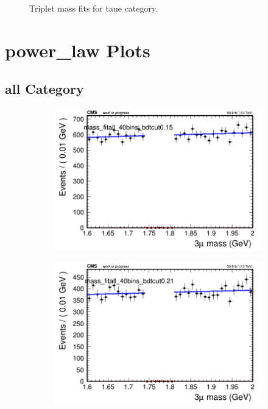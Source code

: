 \begin{figure}[H]
\begin{subfigure}{0.2\textwidth}
        \caption{}
    \end{subfigure}
    \caption{Triplet mass fits for taue category.}
    \label{fig:unfixedexptaue}
\end{figure}

\section{power\_law Plots}

\subsection{all Category}
\label{sec:powerlawall}

\begin{figure}[H]
    \centering
    \begin{subfigure}{0.2\textwidth}
        \includegraphics[width=\textwidth]{power_law/plots/all/massfit_all_40bins_bdtcut0.15.png}
        \caption{}
    \end{subfigure}
    \begin{subfigure}{0.2\textwidth}
        \includegraphics[width=\textwidth]{power_law/plots/all/massfit_all_40bins_bdtcut0.21.png}

\end{subfigure}
\end{figure}
